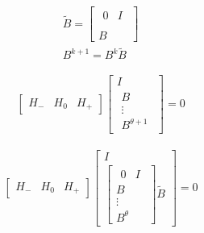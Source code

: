 \documentclass{article}
\begin{document}
{\begin{gather*}
  \tilde{B}=
  \begin{bmatrix}
    \begin{matrix}
0&I\\      
    \end{matrix}\\
B
  \end{bmatrix}\\
B^{k+1} = B^k \tilde{B}
\end{gather*}




\begin{gather*}
  \begin{bmatrix}
    H_{-}&H_{0}&H_{+}
  \end{bmatrix}
  \begin{bmatrix}
    I\\
\begin{matrix}
      B\\\vdots\\B^{\theta+1}
    \end{matrix}
  \end{bmatrix}=0
\end{gather*}

\begin{gather*}
  \begin{bmatrix}
    H_{-}&H_{0}&H_{+}
  \end{bmatrix}
  \begin{bmatrix}
    I\\
\begin{bmatrix}
  \begin{matrix}
0&I    
  \end{matrix}\\
      B\\\vdots\\B^\theta
    \end{bmatrix}\tilde{B}
  \end{bmatrix}=0
\end{gather*}



}
\end{document}
